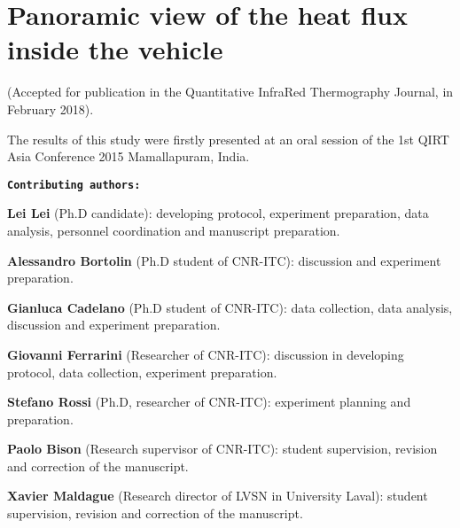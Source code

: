 \chapter{Panoramic view of the heat flux inside the vehicle}     %
(Accepted for publication in the Quantitative InfraRed Thermography Journal, in February 2018).


The results of this study were firstly presented at an oral session of the 1st QIRT Asia Conference 2015 Mamallapuram, India. %

\textbf{\texttt{Contributing authors:}}

\textbf{\textsf{Lei Lei}} (Ph.D candidate): developing protocol, experiment preparation, data analysis,  personnel coordination and manuscript preparation.

\textbf{Alessandro Bortolin} (Ph.D student of CNR-ITC): discussion and experiment preparation.

\textbf{Gianluca Cadelano} (Ph.D student of CNR-ITC): data collection, data analysis, discussion and experiment preparation.

\textbf{Giovanni Ferrarini} (Researcher of CNR-ITC): discussion in developing protocol, data collection, experiment preparation.

\textbf{Stefano Rossi} (Ph.D, researcher of CNR-ITC): experiment planning and preparation.

\textbf{Paolo Bison} (Research supervisor of CNR-ITC): student supervision, revision and correction of the manuscript. 

\textbf{Xavier Maldague} (Research director of LVSN in University Laval): student supervision, revision and correction of the manuscript.






